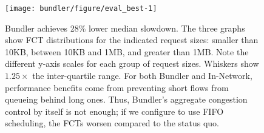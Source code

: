 \begin{figure}
    \centering
\begin{knitrout}
\color{fgcolor}
\texttt{[image: bundler/figure/eval\_best-1]} 

\end{knitrout}
    \caption{Bundler achieves 28\% lower median slowdown. 
The three graphs show FCT distributions for the indicated request sizes: smaller than 10KB, between 10KB and 1MB, and greater than 1MB.  Note the different y-axis scales for each group of request sizes. Whiskers show $1.25 \times$ the inter-quartile range. 
For both Bundler and In-Network, performance benefits come from preventing short flows from queueing behind long ones.
Thus, Bundler's aggregate congestion control by itself is not enough; if we configure \name to use FIFO scheduling, the FCTs worsen compared to the status quo.
    }\label{fig:eval:best}
\end{figure}
\newcommand{\overviewBenefitsBaselineMedian}{1.76\xspace}
\newcommand{\overviewBenefitsBaselineTail}{79.37\xspace}
\newcommand{\overviewBenefitsBundlerMedian}{1.26\xspace}
\newcommand{\overviewBenefitsBundlerTail}{41.38\xspace}
\newcommand{\overviewBenefitsOptimalMedian}{1.07\xspace}
\newcommand{\overviewBenefitsOptimalTail}{27.49\xspace}
\newcommand{\overviewBenefitsBundlerMedianImprovement}{28\%\xspace}
